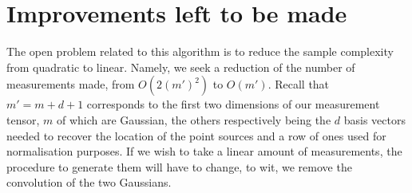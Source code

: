 \section{Improvements left to be made}
The open problem related to this algorithm is to reduce the sample complexity from quadratic to linear. Namely, we seek a reduction of the number of measurements made, from $O(2(m')^2)$ to $O(m')$. Recall that $m'=m+d+1$ corresponds to the first two dimensions of our measurement tensor, $m$ of which are Gaussian, the others respectively being the $d$ basis vectors needed to recover the location of the point sources and a row of ones used for normalisation purposes. If we wish to take a linear amount of measurements, the procedure to generate them will have to change, to wit, we remove the convolution of the two Gaussians.%